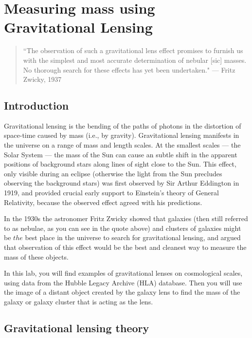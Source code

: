 \chapter{Measuring mass using Gravitational Lensing}

\begin{quote}
	``The observation of such a gravitational lens effect promises to
		furnish us with the simplest and most accurate determination of
		nebular [sic] masses. No thorough search for these effects has
		yet been undertaken."  --- Fritz Zwicky, 1937
\end{quote}

\section{Introduction}

Gravitational lensing is the bending of the paths of photons in the
distortion of space-time caused by mass (i.e., by gravity). Gravitational
lensing manifests in the universe on a range of mass and length
scales. At the smallest scales --- the Solar System --- the mass of the
Sun can cause an subtle shift in the apparent positions of background
stars along lines of sight close to the Sun. This effect, only visible
during an eclipse (otherwise the light from the Sun precludes observing
the background stars) was first observed by Sir Arthur Eddington in
1919, and provided crucial early support to Einstein's theory of General Relativity, because the
observed effect agreed with his predictions.

In the 1930s the astronomer Fritz Zwicky showed that galaxies (then
still referred to as nebulae, as you can see in the quote above) and
clusters of galaxies might be $the$ best place in the universe to
search for gravitational lensing, and argued that observation of this
effect would be the best and cleanest way to measure the mass of these
objects. 

In this lab, you will find examples of gravitational lenses on cosmological scales,
using data from the 
Hubble Legacy Archive (HLA) database.
Then you will use the image of a distant
object created by the galaxy lens to find the mass of the galaxy or
galaxy cluster that is acting as the lens.

\section{Gravitational lensing theory}

